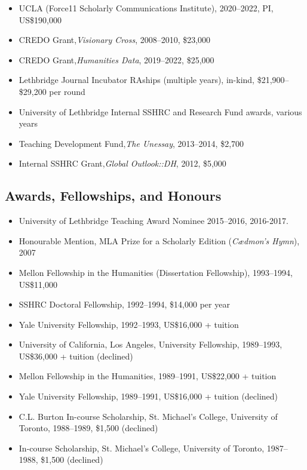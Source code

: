 \documentclass[12pt]{article}
\begin{document}
\begin{itemize}
  \item UCLA (Force11 Scholarly Communications Institute), 2020–2022, PI, US\$190,000
  \item CREDO Grant,\textit{Visionary Cross}, 2008–2010, \$23,000
  \item CREDO Grant,\textit{Humanities Data}, 2019–2022, \$25,000
  \item Lethbridge Journal Incubator RAships (multiple years), in-kind, \$21,900–\$29,200 per round
  \item University of Lethbridge Internal SSHRC and Research Fund awards, various years
  \item Teaching Development Fund,\textit{The Unessay}, 2013–2014, \$2,700
  \item Internal SSHRC Grant,\textit{Global Outlook::DH}, 2012, \$5,000
\end{itemize}


\subsection*{Awards, Fellowships, and Honours}

\begin{itemize}
  \item University of Lethbridge Teaching Award Nominee 2015–2016, 2016-2017.
  \item Honourable Mention, MLA Prize for a Scholarly Edition (\textit{Cædmon’s Hymn}), 2007
  \item Mellon Fellowship in the Humanities (Dissertation Fellowship), 1993–1994, US\$11,000
  \item SSHRC Doctoral Fellowship, 1992–1994, \$14,000 per year
  \item Yale University Fellowship, 1992–1993, US\$16,000 + tuition
  \item University of California, Los Angeles, University Fellowship, 1989–1993, US\$36,000 + tuition (declined)
  \item Mellon Fellowship in the Humanities, 1989–1991, US\$22,000 + tuition
  \item Yale University Fellowship, 1989–1991, US\$16,000 + tuition (declined)
  \item C.L. Burton In-course Scholarship, St. Michael’s College, University of Toronto, 1988–1989, \$1,500 (declined)
  \item In-course Scholarship, St. Michael’s College, University of Toronto, 1987–1988, \$1,500 (declined)
\end{itemize}
\end{document}
